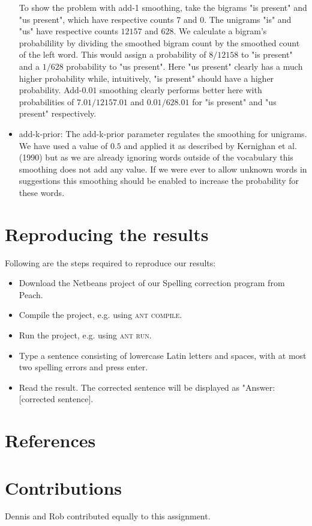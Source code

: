 \documentclass[11pt,a4paper]{article}
\begin{document}
\begin{itemize}
To show the problem with add-1 smoothing, take the bigrams "is present" and "us present", which have respective counts $7$ and $0$. The unigrams "is" and "us" have respective counts $12157$ and $628$. We calculate a bigram's probabilility by dividing the smoothed bigram count by the smoothed count of the left word. This would assign a probability of $8/12158$ to "is present" and a $1/628$ probability to "us present". Here "us present" clearly has a much higher probability while, intuitively, "is present" should have a higher probability. Add-$0.01$ smoothing clearly performs better here with probabilities of $7.01/12157.01$ and $0.01/628.01$ for "is present" and "us present" respectively.
\item add-k-prior: The add-k-prior parameter regulates the smoothing for unigrams. We have used a value of $0.5$ and applied it as described by Kernighan et al. (1990) but as we are already ignoring words outside of the vocabulary this smoothing does not add any value. If we were ever to allow unknown words in suggestions this smoothing should be enabled to increase the probability for these words.
\end{itemize}

\section{Reproducing the results}
Following are the steps required to reproduce our results:
\begin{itemize}
\item Download the Netbeans project of our Spelling correction program from Peach.
\item Compile the project, e.g. using \textsc{ant compile}.
\item Run the project, e.g. using \textsc{ant run}.
\item Type a sentence consisting of lowercase Latin letters and spaces, with at most two spelling errors and press enter.
\item Read the result. The corrected sentence will be displayed as "Answer: [corrected sentence].
\end{itemize}

\section{References}


\section{Contributions}
Dennis and Rob contributed equally to this assignment.
\end{document}
